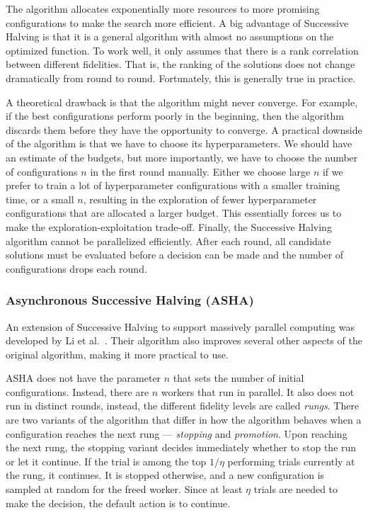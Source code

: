 The algorithm allocates exponentially more resources to more promising configurations to make the search more efficient. A big advantage of Successive Halving is that it is a general algorithm with almost no assumptions on the optimized function. To work well, it only assumes that there is a rank correlation between different fidelities. That is, the ranking of the solutions does not change dramatically from round to round. Fortunately, this is generally true in practice.

A theoretical drawback is that the algorithm might never converge. For example, if the best configurations perform poorly in the beginning, then the algorithm discards them before they have the opportunity to converge. A practical downside of the algorithm is that we have to choose its hyperparameters. We should have an estimate of the budgets, but more importantly, we have to choose the number of configurations $n$ in the first round manually. Either we choose large $n$ if we prefer to train a lot of hyperparameter configurations with a smaller training time, or a small $n$, resulting in the exploration of fewer hyperparameter configurations that are allocated a larger budget. This essentially forces us to make the exploration-exploitation trade-off. Finally, the Successive Halving algorithm cannot be parallelized efficiently. After each round, all candidate solutions must be evaluated before a decision can be made and the number of configurations drops each round.

\subsubsection{Asynchronous Successive Halving (ASHA)}
 An extension of Successive Halving to support massively parallel computing was developed by Li et al.~\cite{li2020system}. Their algorithm also improves several other aspects of the original algorithm, making it more practical to use.

 ASHA does not have the parameter $n$ that sets the number of initial configurations. Instead, there are $n$ workers that run in parallel. It also does not run in distinct rounds, instead, the different fidelity levels are called \textit{rungs}. There are two variants of the algorithm that differ in how the algorithm behaves when a configuration reaches the next rung --- \textit{stopping} and \textit{promotion}. Upon reaching the next rung, the stopping variant decides immediately whether to stop the run or let it continue. If the trial is among the top $1/\eta$ performing trials currently at the rung, it continues. It is stopped otherwise, and a new configuration is sampled at random for the freed worker. Since at least $\eta$ trials are needed to make the decision, the default action is to continue.

